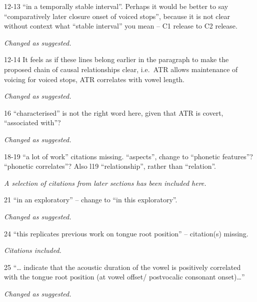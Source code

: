 \documentclass[]{article}
\begin{document}
12-13 ``in a temporally stable interval''. Perhaps it would be better to
say ``comparatively later closure onset of voiced stops'', because it is
not clear without context what ``stable interval'' you mean -- C1
release to C2 release.

\begin{adjustwidth}{1cm}{} \textit{
Changed as suggested.
} \end{adjustwidth}

12-14 It feels as if these lines belong earlier in the paragraph to make
the proposed chain of causal relationships clear, i.e.~ATR allows
maintenance of voicing for voiced stops, ATR correlates with vowel
length.

\begin{adjustwidth}{1cm}{} \textit{
Changed as suggested.
} \end{adjustwidth}

16 ``characterised'' is not the right word here, given that ATR is
covert, ``associated with''?

\begin{adjustwidth}{1cm}{} \textit{
Changed as suggested.
} \end{adjustwidth}

18-19 ``a lot of work'' citations missing. ``aspects'', change to
``phonetic features''? ``phonetic correlates''? Also l19
``relationship'', rather than ``relation''.

\begin{adjustwidth}{1cm}{} \textit{
A selection of citations from later sections has been included here.
} \end{adjustwidth}

21 ``in an exploratory'' -- change to ``in this exploratory''.

\begin{adjustwidth}{1cm}{} \textit{
Changed as suggested.
} \end{adjustwidth}

24 ``this replicates previous work on tongue root position'' --
citation(s) missing.

\begin{adjustwidth}{1cm}{} \textit{
Citations included.
} \end{adjustwidth}

25 ``\ldots{} indicate that the acoustic duration of the vowel is
positively correlated with the tongue root position (at vowel offset/
postvocalic consonant onset)\ldots{}''

\begin{adjustwidth}{1cm}{} \textit{
Changed as suggested.
} \end{adjustwidth}
\end{document}
